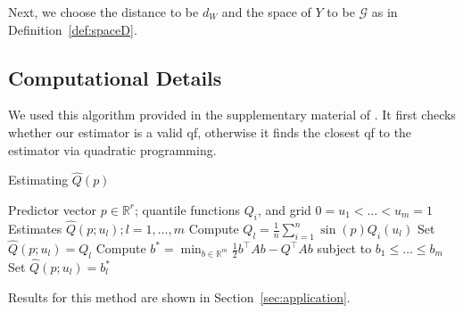 Next, we choose the distance to be $d_W$ and the space of $Y$ to be $\mathcal{G}$ as in Definition~\ref{def:spaceD}.
\subsection{Computational Details}
\label{sec:computation}
We used this algorithm provided in the supplementary material of \textcite{PetersenLiuDivani2021}.
It first checks whether our estimator is a valid qf, otherwise it finds the closest qf
to the estimator via quadratic programming.
\begin{algorithm}
    \caption{Estimating \(\hat{Q}(p)\)}
    \label{alg:quadprog}
    \begin{algorithmic}[1]
    \Require Predictor vector \( p \in \mathbb{R}^r \); quantile functions \( Q_i \), and grid \( 0 = u_1 < \ldots < u_m = 1 \)
    \Ensure Estimates \( \hat{Q}(p; u_l); l = 1, \ldots, m \)
        \State Compute \( Q_l = \frac{1}{n} \sum_{i=1}^{n} \sin(p) Q_i(u_l) \)
    \EndFor
        \State Set \( \hat{Q}(p; u_l) = Q_l \)
    \Else
        \State Compute \( b^* = \min_{b \in \mathbb{R}^m} \frac{1}{2} b^\top A b - Q^\top A b \) subject to \( b_1 \leq \ldots \leq b_m \)
        \State Set \( \hat{Q}(p; u_l) = b^*_l \)
    \EndIf
    \end{algorithmic}
\end{algorithm}

Results for this method are shown in Section~\ref{sec:application}. 
